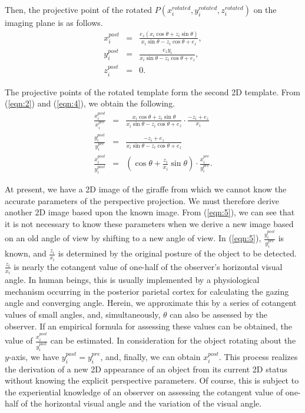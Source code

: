 \documentclass[journal]{IEEEtran}
\begin{document}
Then, the projective point of the rotated $P(x_i^{rotated},y_i^{rotated},z_i^{rotated})$ on the imaging plane is as follows.
\begin{eqnarray}
x_i^{post}&=&\frac{e_z(x_i \cos\theta+z_i \sin\theta)}{x_i \sin\theta-z_i \cos\theta+e_z}, \nonumber\\
y_i^{post}&=&\frac{e_z y_i}{x_i \sin\theta-z_i \cos\theta+e_z}, \nonumber\\
z_i^{post}&=&0.
\label{eqn:4}
\end{eqnarray}

The projective points of the rotated template form the second 2D template.
From (\ref{eqn:2}) and (\ref{eqn:4}), we obtain the following.
\begin{eqnarray}
\frac{x_i^{post}}{x_i^{pre}}&=&\frac{x_i \cos\theta+z_i \sin\theta}{x_i \sin\theta-z_i \cos\theta+e_z}
\cdot\frac{-z_i+e_z}{x_i} \nonumber\\
\frac{y_i^{post}}{y_i^{pre}}&=&\frac{-z_i+e_z}{x_i \sin\theta-z_i \cos\theta+e_z} \nonumber\\
\frac{x_i^{post}}{y_i^{post}}
&=&\left(\cos\theta+\frac{z_i}{x_i}\sin\theta\right)\cdot\frac{x_i^{pre}}{y_i^{pre}}.
\label{eqn:5}
\end{eqnarray}

At present, 
we have a 2D image of the giraffe from which we cannot know the accurate parameters of the perspective projection. 
We must therefore derive another 2D image based upon the known image. 
From (\ref{eqn:5}), we can see that it is not necessary to know these parameters when we derive a new image based on an old angle of view by shifting to a new angle of view. 
In (\ref{eqn:5}), $\frac{y_i^{post}}{y_i^{pre}}$ is known,
and $\frac{z_i}{x_i}$ is determined by the original posture of the object to be detected. 
$\frac{z_i}{x_i}$ is nearly the cotangent value of one-half of the observer's horizontal visual angle. 
In human beings, this is usually implemented by a physiological mechanism occurring in the posterior parietal cortex for calculating the gazing angle and converging angle. 
Herein, we approximate this by a series of cotangent values of small angles, 
and, simultaneously, $\theta$ can also be assessed by the observer. 
If an empirical formula for assessing these values can be obtained, 
the value of $\frac{x_i^{post}}{y_i^{post}}$ can be estimated. 
In consideration for the object rotating about the $y$-axis, we have $y_i^{post}=y_i^{pre}$, 
and, finally, we can obtain $x_i^{post}$. 
This process realizes the derivation of a new 2D appearance of an object from its current 2D status without knowing the explicit perspective parameters. 
Of course, this is subject to the experiential knowledge of an observer on assessing the cotangent value of one-half of the horizontal visual angle and the variation of the visual angle.
\end{document}

